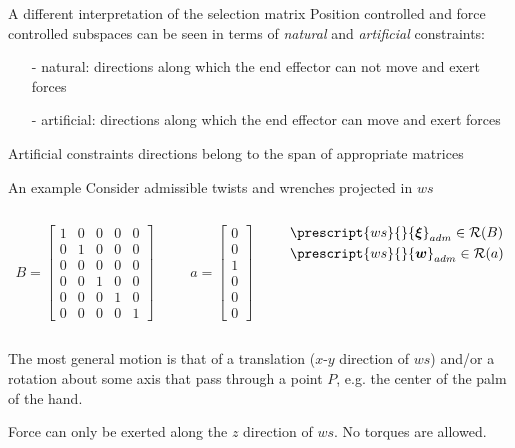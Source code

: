 \begin{frame}{A different interpretation of the selection matrix}
  Position controlled and force controlled subspaces can be seen in terms of
  \emph{natural} and \emph{artificial} constraints:
  \begin{itemize}
  \item[-]natural: directions along which the end effector can not move and exert forces
  \item[-]artificial: directions along which the end effector can move and exert forces
  \end{itemize}
  \par
  Artificial constraints directions belong to the span of appropriate matrices
\end{frame}

\begin{frame}{An example}
  Consider admissible twists and wrenches projected in $ws$
  \begin{columns}
    \begin{column}{0.4\columnwidth}
      \[
      B=
      \begin {bmatrix}
        1 & 0 & 0 & 0 & 0\\
        0 & 1 & 0 & 0 & 0\\
        0 & 0 & 0 & 0 & 0\\
        0 & 0 & 1 & 0 & 0\\
        0 & 0 & 0 & 1 & 0\\
        0 & 0 & 0 & 0 & 1
      \end {bmatrix}
      \]
    \end{column}
    \begin{column}{0.2\columnwidth}
      \[
      a=
      \begin {bmatrix}
        0 \\
        0 \\
        1 \\
        0 \\
        0 \\
        0 
      \end {bmatrix}
      \]
    \end{column}
    \begin{column}{0.4\columnwidth}
      \[
      \begin{split}
        & \prescript{ws}{}{\boldsymbol{\xi}}_{adm} \in \mathcal{R}(B)\\
        & \prescript{ws}{}{\vec{w}}_{adm} \in \mathcal{R}(a)
      \end{split}
      \]
    \end{column}
  \end{columns}

  The most general motion is that of a translation ($x$-$y$ direction of $ws$)
  and/or a rotation about some axis that pass through a point $P$, e.g. the center of the 
  palm of the hand.
  \par
  Force can only be exerted along the $z$ direction of $ws$. No torques are allowed.
  \end{frame}

